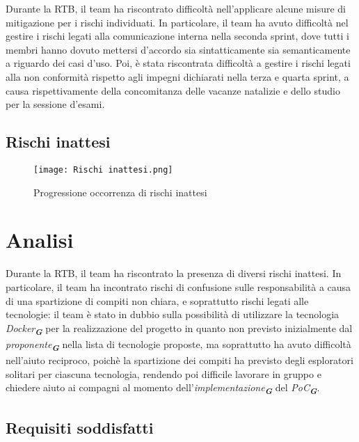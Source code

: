 Durante la RTB, il team ha riscontrato difficoltà nell'applicare alcune misure di mitigazione
per i rischi individuati. In particolare, il team ha avuto difficoltà nel gestire i rischi
legati alla comunicazione interna nella seconda sprint, dove tutti i membri hanno 
dovuto mettersi d'accordo sia sintatticamente sia semanticamente a riguardo dei casi d'uso.
Poi, è stata riscontrata difficoltà a gestire i rischi legati alla non conformità rispetto 
agli impegni dichiarati nella terza e quarta sprint, a causa rispettivamente della concomitanza
delle vacanze natalizie e dello studio per la sessione d'esami.

\newpage

\subsection{Rischi inattesi}
\label{subsec:Rischi inattesi}

\begin{figure}[h] 
    \centering
    \texttt{[image: Rischi inattesi.png]}
    \caption{Progressione occorrenza di rischi inattesi} 
    \label{fig: Rischi inattesi}
\end{figure}

\section*{Analisi}

Durante la RTB, il team ha riscontrato la presenza di diversi rischi inattesi. In particolare, 
il team ha incontrato rischi di confusione sulle responsabilità a causa di una spartizione di
compiti non chiara, e soprattutto rischi legati alle tecnologie: il team è stato in dubbio sulla
possibilità di utilizzare la tecnologia \emph{Docker}\textsubscript{\textbf{\textit{G}}} per la 
realizzazione del progetto in quanto non previsto inizialmente dal \emph{proponente}\textsubscript{\textbf{\textit{G}}} 
nella lista di tecnologie proposte, ma soprattutto ha avuto difficoltà nell'aiuto reciproco, poichè
la spartizione dei compiti ha previsto degli esploratori solitari per ciascuna tecnologia, rendendo poi
difficile lavorare in gruppo e chiedere aiuto ai compagni al momento dell'\emph{implementazione}\textsubscript{\textbf{\textit{G}}} del 
\emph{PoC}\textsubscript{\textbf{\textit{G}}}.

\newpage

\subsection{Requisiti soddisfatti}
\label{subsec:Requisiti soddisfatti}

